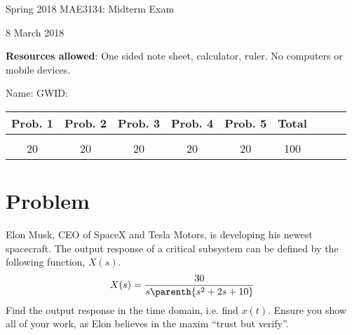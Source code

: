 \documentclass[titlepage, 11pt, reqno]{article}    %
\begin{document}
\begin{titlepage}
    \centering
    \vspace{1cm}
    {\Large Spring 2018 MAE3134: Midterm Exam\par }
    \vspace{3cm}
    {8 March 2018\par}
    \vspace{1cm}
    \textbf{Resources allowed}: One sided note sheet, calculator, ruler. 
    No computers or mobile devices.

    \vspace{1cm}
    {Name: \underline{\hspace{5cm}} \hspace{2cm} GWID:\underline{\hspace{5cm}}\par}
    \vspace{3cm}

    \begin{tabular}{|c|c|c|c|c|c|c|c|c|}
        \hline
        Prob. 1 & Prob. 2 & Prob. 3 & Prob. 4 & Prob. 5 & Total \\
        \hline
         & & & & & \\[4ex]
        \hline
        20 & 20 & 20 & 20 & 20 & 100 \\[4ex]
        \hline
    \end{tabular}
    \vfill
\end{titlepage}

\section{Problem}
Elon Musk, CEO of SpaceX and Tesla Motors, is developing his newest spacecraft.
The output response of a critical subsystem can be defined by the following function, \( X(s) \).
\begin{align*}
    X(s) = \frac{30}{s\parenth{s^2 + 2s + 10}}
\end{align*}
Find the output response in the time domain, i.e. find \( x(t) \).
Ensure you show all of your work, as Elon believes in the maxim ``trust but verify''.


\clearpage\newpage
\mbox{}
\clearpage\newpage
\end{document}
